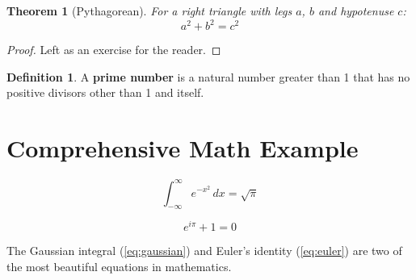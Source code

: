 \newtheorem{theorem}{Theorem}[section]
\newtheorem{lemma}[theorem]{Lemma}
\theoremstyle{definition}
\newtheorem{definition}{Definition}[section]

\begin{theorem}[Pythagorean]
For a right triangle with legs $a$, $b$ and hypotenuse $c$:
\[ a^2 + b^2 = c^2 \]
\end{theorem}

\begin{proof}
Left as an exercise for the reader.
\end{proof}

\begin{definition}
A \textbf{prime number} is a natural number greater than 1 that has no positive divisors other than 1 and itself.
\end{definition}

\section{Comprehensive Math Example}

\begin{equation}
    \int_{-\infty}^{\infty} e^{-x^2}\,dx = \sqrt{\pi}
    \label{eq:gaussian}
\end{equation}

\begin{equation}
    e^{i\pi} + 1 = 0
    \label{eq:euler}
\end{equation}

The Gaussian integral (\ref{eq:gaussian}) and Euler's identity (\ref{eq:euler}) are two of the most beautiful equations in mathematics.
